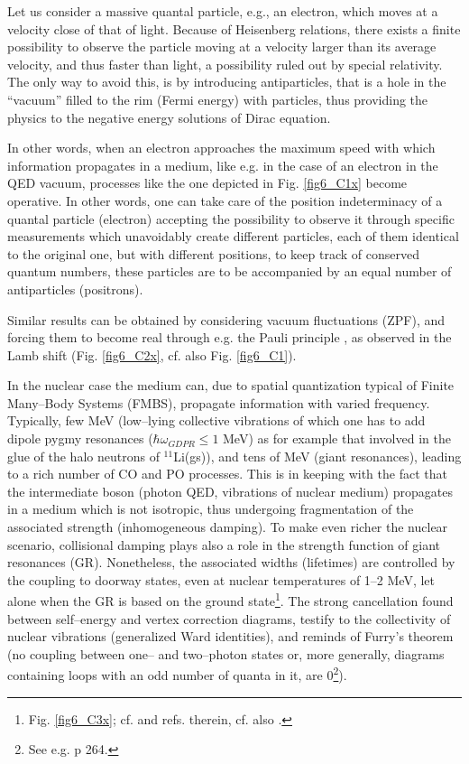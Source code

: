 \begin{subappendices}
Let us consider a massive quantal particle, e.g., an electron, which moves at a velocity close of that of light. Because of Heisenberg relations, there exists a finite possibility to observe the particle moving at a velocity larger than its average velocity, and thus faster than light, a possibility ruled out by special relativity. The only way to avoid this, is by introducing antiparticles, that is a hole in the ``vacuum'' filled to the rim (Fermi energy) with particles, thus providing the physics to the negative energy solutions of Dirac equation.

In other words, when an electron approaches the maximum speed with which information propagates in a medium, like e.g. in the case of an electron in the QED vacuum, processes like the one depicted in Fig. \ref{fig6_C1x} become operative. In other words, one can take care of the position indeterminacy of a quantal particle (electron) accepting the possibility to observe it through specific measurements which unavoidably create different particles, each of them identical to the original one, but with different positions, to keep track of conserved quantum numbers, these particles are to be accompanied by an equal number of antiparticles (positrons).

Similar results can be obtained by considering vacuum fluctuations (ZPF), and forcing them to become real through e.g. the Pauli principle \citep{Pauli:47}, as observed in the Lamb shift (Fig. \ref{fig6_C2x}, cf. also Fig. \ref{fig6_C1}).


In the nuclear case the medium can, due to spatial quantization typical of Finite Many--Body Systems (FMBS), propagate information with varied frequency. Typically, few MeV (low--lying collective vibrations of  which one has to add dipole pygmy resonances ($\hbar\omega_{GDPR}\leq 1$ MeV) as for example that involved in the glue of the halo neutrons of $^{11}$Li(gs)), and tens of MeV (giant resonances), leading to a rich number of CO and PO processes. This is in keeping with the fact that the intermediate boson (photon QED, vibrations of nuclear medium) propagates in a medium which is not isotropic, thus undergoing fragmentation of the associated strength (inhomogeneous damping). To make even richer the nuclear scenario, collisional damping plays also a role in the strength function of giant resonances (GR). Nonetheless, the associated widths (lifetimes) are controlled by the coupling to doorway states, even at nuclear temperatures of 1--2 MeV, let alone when the GR is based on the ground state\footnote{Fig. \ref{fig6_C3x}; cf. \cite{Bortignon:98} and refs. therein, cf. also \cite{Broglia:87}.}. The strong cancellation found between self--energy and vertex correction diagrams, testify to the collectivity of nuclear vibrations (generalized Ward identities), and reminds of Furry's theorem (no coupling between one-- and two--photon states or, more generally, diagrams containing loops with an odd number of quanta in it, are 0\footnote{See e.g. \cite{Mehra:96} p 264.}).



\end{subappendices}
